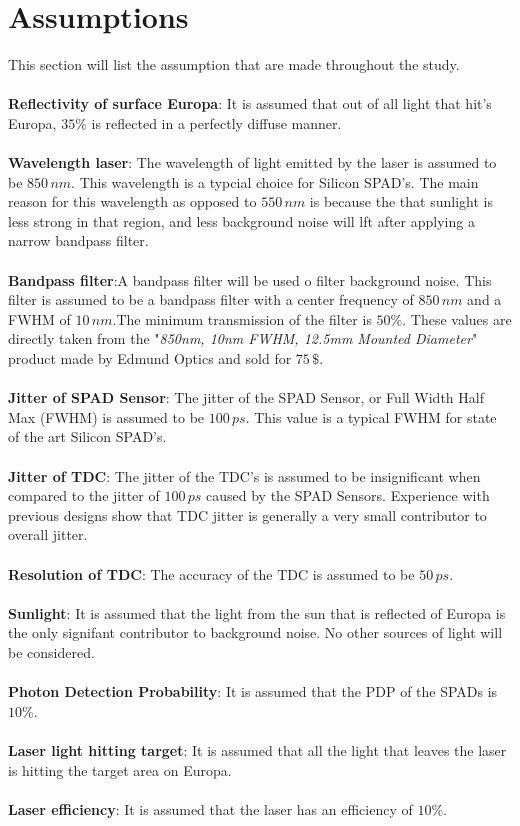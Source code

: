\section{Assumptions} 
\label{ssec:assumptions}
This section will list the assumption that are made throughout the study.\\
\\
\textbf{Reflectivity of surface Europa}: It is assumed that out of all light that hit's Europa, $35\%$ is reflected in a perfectly diffuse manner.\\ 
\\
\textbf{Wavelength laser}: The wavelength of light emitted by the laser is assumed to be $850\,nm$. This wavelength is a typcial choice for Silicon SPAD's. The main reason for this wavelength as opposed to $550\,nm$ is because the that sunlight is less strong in that region, and less background noise will lft after applying a narrow bandpass filter. \\
\\
\textbf{Bandpass filter}:A bandpass filter will be used o filter background noise. This filter is assumed to be a bandpass filter with a center frequency of $850\,nm$ and a FWHM of $10\,nm$.The minimum transmission of the filter is $50\%$. These values are directly taken from the "\textit{850nm, 10nm FWHM, 12.5mm Mounted Diameter}" product made by Edmund Optics and sold for $75\,\$$.\\
\\
\textbf{Jitter of SPAD Sensor}: The jitter of the SPAD Sensor, or Full Width Half Max (FWHM) is assumed to be $100\,ps$. This value is a typical FWHM for state of the art Silicon SPAD's. \\
\\
\textbf{Jitter of TDC}: The jitter of the TDC's is assumed to be insignificant when compared to the jitter of $100\,ps$ caused by the SPAD Sensors. Experience with previous designs show that TDC jitter is generally a very small contributor to overall jitter.\\
\\
\textbf{Resolution of TDC}: The accuracy of the TDC is assumed to be $50\,ps$.\\
\\
\textbf{Sunlight}: It is assumed that the light from the sun that is reflected of Europa is the only signifant contributor to background noise. No other sources of light will be considered. \\
\\
\textbf{Photon Detection Probability}: It is assumed that the PDP of the SPADs is $10\%$.\\
\\
\textbf{Laser light hitting target}: It is assumed that all the light that leaves the laser is hitting the target area on Europa.
\\
\\
\textbf{Laser efficiency}: It is assumed that the laser has an efficiency of $10\%$.
